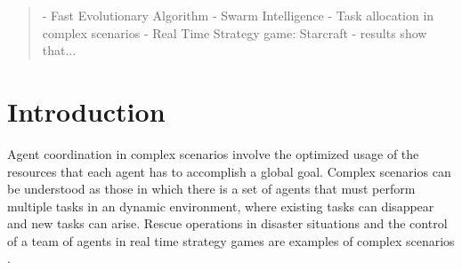 \documentclass[conference]{IEEEtran}
\begin{document}
\newcommand{\agentset}{\mathcal{I}}
\newcommand{\taskset}{\mathcal{J}}

\newcommand{\agtres}[1]{\ensuremath{r_{#1}}}
\newcommand{\agtcap}[2]{\ensuremath{k_{#1#2}}}
\newcommand{\rescspt}[2]{\ensuremath{c_{#1#2}}}
\newcommand{\egminus}{E-GAP$^-$}

\newcommand{\stimulus}[1]{\ensuremath{s_#1}}
\newcommand{\respthresh}[2]{\ensuremath{\theta_{#1#2}}}
\newcommand{\tendency}[2]{\ensuremath{T_{#1#2}}}
\newcommand{\capability}[2]{\ensuremath{f_{#1#2}}}

\newcommand{\ETS}{\textit{Extreme Teams}}
\newcommand{\botit}{\textit{bot }}
\newcommand{\Random}{\textit{Random }}

\maketitle


\begin{abstract}
- Fast Evolutionary Algorithm
- Swarm Intelligence
- Task allocation in complex scenarios
- Real Time Strategy game: Starcraft
- results show that...
\end{abstract}






%
\IEEEpeerreviewmaketitle



\section{Introduction}
\label{sec:intro}
Agent coordination in complex scenarios involve the optimized usage of the resources that each agent has to accomplish a global goal. Complex scenarios can be understood as those in which there is a set of agents that must perform multiple tasks in an dynamic environment, where existing tasks can disappear and new tasks can arise. Rescue operations in disaster situations \cite{Kitano2000} and the control of a team of agents in real time strategy games are examples of complex scenarios \cite{Weber+2011}.
\end{document}
